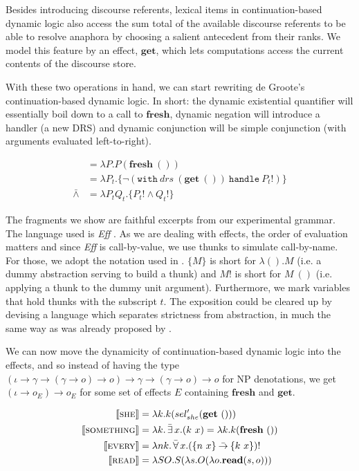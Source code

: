 \documentclass{article}
\newcommand{\dand}{\mathbin{\bar{\land}}}
\newcommand{\dnot}{\mathop{\bar{\lnot}}}
\newcommand{\dimpl}{\mathbin{\bar{\to}}}
\newcommand{\dexists}{\mathop{\bar{\exists}}}
\newcommand{\dforall}{\mathop{\bar{\forall}}}
\newcommand{\sem}[1]{\llbracket #1 \rrbracket}
\newcommand{\keyword}[1]{\texttt{#1}}
\newcommand{\effect}[1]{\textbf{#1}}
\newcommand{\semdom}[1]{\textbf{#1}}
\newcommand{\handle}[2]{\keyword{with}\ #1\ \keyword{handle}\ #2}
\begin{document}
Besides introducing discourse referents, lexical items in continuation-based
dynamic logic also access the sum total of the available discourse referents
to be able to resolve anaphora by choosing a salient antecedent from their
ranks. We model this feature by an effect, $\effect{get}$, which lets
computations access the current contents of the discourse store.

With these two operations in hand, we can start rewriting de Groote's
continuation-based dynamic logic. In short: the dynamic existential quantifier
will essentially boil down to a call to $\effect{fresh}$, dynamic negation
will introduce a handler (a new DRS) and dynamic conjunction will be simple
conjunction (with arguments evaluated left-to-right).

\vspace{-4mm}

\begin{align*}
  \dexists &= \lambda P. P (\effect{fresh}\ ()) \\
  \dnot &= \lambda P_t. \{ \lnot (\handle{drs\ (\effect{get}\ ())}{P_t!}) \} \\
  \dand &= \lambda P_t Q_t. \{ P_t! \land Q_t! \}
\end{align*}

The fragments we show are faithful excerpts from our experimental grammar. The
language used is \emph{Eff} \citep{bauer2012programming}. As we are dealing
with effects, the order of evaluation matters and since \emph{Eff} is
call-by-value, we use thunks to simulate call-by-name. For those, we adopt the
notation used in \citet {kammar2013handlers}. $\{ M \}$ is short for $\lambda
(). M$ (i.e. a dummy abstraction serving to build a thunk) and $M!$ is short
for $M\ ()$ (i.e. applying a thunk to the dummy unit argument). Furthermore,
we mark variables that hold thunks with the subscript $t$. The exposition
could be cleared up by devising a language which separates strictness from
abstraction, in much the same way as was already proposed by
\citet{kiselyov2008call}.

We can now move the dynamicity of continuation-based dynamic logic into the
effects, and so instead of having the type $(\iota \to \gamma \to (\gamma \to
o) \to o) \to \gamma \to (\gamma \to o) \to o$ for NP denotations, we get
$(\iota \to o_E) \to o_E$ for some set of effects $E$ containing
$\effect{fresh}$ and $\effect{get}$.

\vspace{-4mm}

\begin{align*}
  \sem{\textsc{she}} &= \lambda k. k (sel_{she}' (\effect{get}\ ())) \\
  \sem{\textsc{something}} &= \lambda k. \dexists x. (k\ x) = \lambda k. k
  (\effect{fresh}\ ()) \\
  \sem{\textsc{every}} &= \lambda n k. \dforall x. (\{n\ x\} \dimpl \{k\ x\})! \\
  \sem{\textsc{read}} &= \lambda S O. S (\lambda s. O (\lambda
  o. \semdom{read}(s, o)))
\end{align*}
\end{document}
